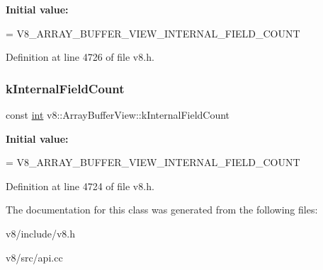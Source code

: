 {\bfseries Initial value\+:}
\begin{DoxyCode}
=
      V8\_ARRAY\_BUFFER\_VIEW\_INTERNAL\_FIELD\_COUNT
\end{DoxyCode}


Definition at line 4726 of file v8.\+h.

\mbox{\label{classv8_1_1ArrayBufferView_a1cccb675b1a91e61411fee5918d451db}} 
\subsubsection{\texorpdfstring{k\+Internal\+Field\+Count}{kInternalFieldCount}}
{\footnotesize\ttfamily const \mbox{\hyperlink{classint}{int}} v8\+::\+Array\+Buffer\+View\+::k\+Internal\+Field\+Count\hspace{0.3cm}{\ttfamily [static]}}

{\bfseries Initial value\+:}
\begin{DoxyCode}
=
      V8\_ARRAY\_BUFFER\_VIEW\_INTERNAL\_FIELD\_COUNT
\end{DoxyCode}


Definition at line 4724 of file v8.\+h.



The documentation for this class was generated from the following files\+:\begin{DoxyCompactItemize}
\item 
v8/include/v8.\+h\item 
v8/src/api.\+cc\end{DoxyCompactItemize}

